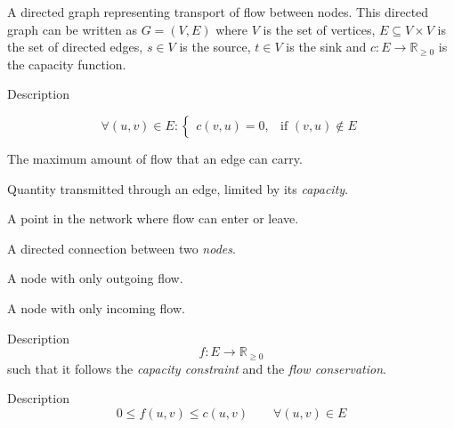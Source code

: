 \documentclass[12pt, openany]{article}
\begin{document}
\begin{definition}
A directed graph representing transport of flow between nodes. This directed graph can be written as $G = (V,E)$ where \(V\) is the set of vertices, \(E \subseteq V \times V\) is the set of directed edges, \(s \in V\) is the source, \(t \in V\) is the sink and \(c : E \to \mathbb{R}_{\ge 0}\) is the capacity function.
\end{definition}

\begin{definition}
    Description

    \[
        \forall (u,v) \in E :
        \begin{cases}
        c(v,u) = 0, & \text{if } (v,u) \notin E
        \end{cases}
    \]
\end{definition}

\begin{definition}
The maximum amount of flow that an edge can carry.
\end{definition}

\begin{definition}[Flow]
Quantity transmitted through an edge, limited by its \emph{capacity}.
\end{definition}

\begin{definition}
A point in the network where flow can enter or leave.
\end{definition}

\begin{definition}
A directed connection between two \emph{nodes}.
\end{definition}

\begin{definition}[Source]
A node with only outgoing flow.
\end{definition}

\begin{definition}[Sink]
A node with only incoming flow.
\end{definition}

\begin{definition}
Description
    \[
f : E \to \mathbb{R}_{\ge 0}
\]
such that it follows the \emph{capacity constraint} and the \emph{flow conservation}.
\end{definition}

\begin{definition}
Description
\[
    0 \le f(u,v) \le c(u,v)
    \qquad \forall (u,v)\in E
    \]
\end{definition}
\end{document}
